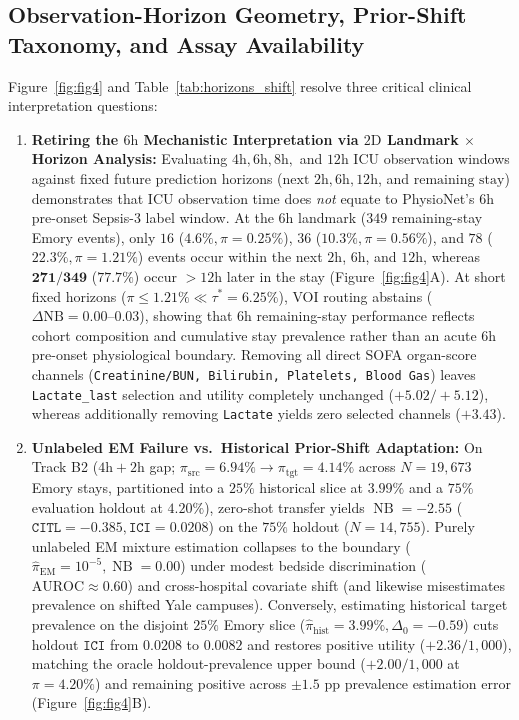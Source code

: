 \documentclass[11pt]{article}
\begin{document}
\subsection{Observation-Horizon Geometry, Prior-Shift Taxonomy, and Assay Availability}
\label{sec:res_horizons}

Figure~\ref{fig:fig4} and Table~\ref{tab:horizons_shift} resolve three critical clinical interpretation questions:
\begin{enumerate}
  \item \textbf{Retiring the $6\text{h}$ Mechanistic Interpretation via $2\text{D}$ Landmark $\times$ Horizon Analysis:} Evaluating $4\text{h}, 6\text{h}, 8\text{h},$ and $12\text{h}$ ICU observation windows against fixed future prediction horizons ($\text{next }2\text{h}, 6\text{h}, 12\text{h}$, and $\text{remaining stay}$) demonstrates that ICU observation time does \emph{not} equate to PhysioNet's $6\text{h}$ pre-onset Sepsis-3 label window. At the $6\text{h}$ landmark ($349$ remaining-stay Emory events), only $16$ ($4.6\%, \pi=0.25\%$), $36$ ($10.3\%, \pi=0.56\%$), and $78$ ($22.3\%, \pi=1.21\%$) events occur within the next $2\text{h}$, $6\text{h}$, and $12\text{h}$, whereas $\mathbf{271/349}$ ($\mathbf{77.7\%}$) occur $>12\text{h}$ later in the stay (Figure~\ref{fig:fig4}A). At short fixed horizons ($\pi \le 1.21\% \ll \tau^*=6.25\%$), VOI routing abstains ($\Delta\text{NB}=0.00\text{--}0.03$), showing that $6\text{h}$ remaining-stay performance reflects cohort composition and cumulative stay prevalence rather than an acute $6\text{h}$ pre-onset physiological boundary. Removing all direct SOFA organ-score channels (\texttt{Creatinine/BUN, Bilirubin, Platelets, Blood Gas}) leaves \texttt{Lactate\_last} selection and utility completely unchanged ($+5.02 / +5.12$), whereas additionally removing \texttt{Lactate} yields zero selected channels ($+3.43$).
  \item \textbf{Unlabeled EM Failure vs.\ Historical Prior-Shift Adaptation:} On Track B2 ($4\text{h}+2\text{h}$ gap; $\pi_{\text{src}}=6.94\% \to \pi_{\text{tgt}}=4.14\%$ across $N=19{,}673$ Emory stays, partitioned into a $25\%$ historical slice at $3.99\%$ and a $75\%$ evaluation holdout at $4.20\%$), zero-shot transfer yields $\operatorname{NB}=-2.55$ ($\texttt{CITL}=-0.385, \texttt{ICI}=0.0208$) on the $75\%$ holdout ($N=14{,}755$). Purely unlabeled \citet{saerens2002adjusting} EM mixture estimation collapses to the boundary ($\hat{\pi}_{\text{EM}}=10^{-5}, \operatorname{NB}=0.00$) under modest bedside discrimination ($\text{AUROC}\approx 0.60$) and cross-hospital covariate shift (and likewise misestimates prevalence on shifted Yale campuses). Conversely, estimating historical target prevalence on the disjoint $25\%$ Emory slice ($\hat{\pi}_{\text{hist}}=3.99\%, \Delta_0=-0.59$) cuts holdout $\texttt{ICI}$ from $0.0208$ to $\mathbf{0.0082}$ and restores positive utility ($\mathbf{+2.36}/1{,}000$), matching the oracle holdout-prevalence upper bound ($+2.00/1{,}000$ at $\pi=4.20\%$) and remaining positive across $\pm 1.5\text{ pp}$ prevalence estimation error (Figure~\ref{fig:fig4}B).

\end{enumerate}
\end{document}
